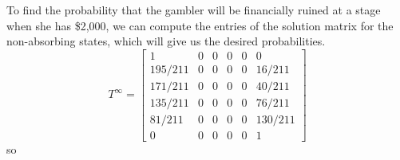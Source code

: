 To find the probability that the gambler will be financially ruined at a stage when she has \$2,000, we can compute the entries of the solution matrix for the non-absorbing states, which will give us the desired probabilities.
\[
    T^\infty= \begin{bmatrix}
        1       & 0 & 0 & 0 & 0 & 0       \\
        195/211 & 0 & 0 & 0 & 0 & 16/211  \\
        171/211 & 0 & 0 & 0 & 0 & 40/211  \\
        135/211 & 0 & 0 & 0 & 0 & 76/211  \\
        81/211  & 0 & 0 & 0 & 0 & 130/211 \\
        0       & 0 & 0 & 0 & 0 & 1
    \end{bmatrix}
\]
so
